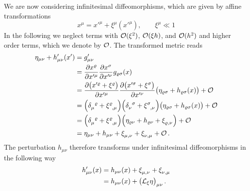 We are now considering infinitesimal diffeomorphisms, which are given by affine
transformations
\begin{equation}
    x^\mu = x'^\mu + \xi^\mu(x'^\mu), \qquad \xi^\mu \ll 1
\end{equation}
In the following we neglect terms with $\mathcal{O}(\xi^2)$, $\mathcal{O}(\xi h)$, and
$\mathcal{O}(h^2)$ and higher order terms, which we denote by $\mathcal{O}$.
The transformed metric reads
\begin{equation}
    \begin{split}
        \eta_{\mu\nu} + h'_{\mu\nu}(x') &= g'_{\mu\nu} \\
        &= \frac{\partial x^\varrho}{\partial x'^\mu} \frac{\partial x^\sigma}{\partial x'^\nu} g_{\varrho\sigma}(x) \\
        &= \frac{\partial \left( x'^\varrho + \xi^\varrho \right)}{\partial x'^\mu}
        \frac{\partial \left( x'^\sigma + \xi^\sigma \right)}{\partial x'^\nu}
        \left( \eta_{\varrho\sigma} + h_{\varrho\sigma}(x) \right) + \landauO \\
        &= \left( \tensor{\delta}{_\mu^\varrho} + \tensor{\xi}{^\varrho_,_\mu} \right)
        \left( \tensor{\delta}{_\nu^\sigma} + \tensor{\xi}{^\sigma_,_\nu} \right)
        \left( \eta_{\varrho\sigma} + h_{\varrho\sigma}(x) \right) + \landauO \\
        &= \left( \tensor{\delta}{_\mu^\varrho} + \tensor{\xi}{^\varrho_,_\mu} \right)
        \left( \eta_{\varrho\nu} + h_{\varrho\nu} + \tensor{\xi}{_\varrho_,_\nu}
        \right) + \landauO \\
        &= \eta_{\mu\nu} + h_{\mu\nu} + \tensor{\xi}{_\mu_,_\nu} +
        \tensor{\xi}{_\nu_,_\mu} + \landauO\,.
    \end{split}
\end{equation}
The perturbation $h_{\mu\nu}$ therefore transforms  under infinitesimal
diffeomorphisms in the following way
\begin{equation}
    \begin{split}
        h'_{\mu\nu}(x) &= h_{\mu\nu}(x) + \tensor{\xi}{_\mu_,_\nu} + \tensor{\xi}{_\nu_,_\mu} \\
        &= h_{\mu\nu}(x) + \left(\liedif{\xi}{\eta} \right)_{\mu\nu}\,.
    \end{split}
\end{equation}
